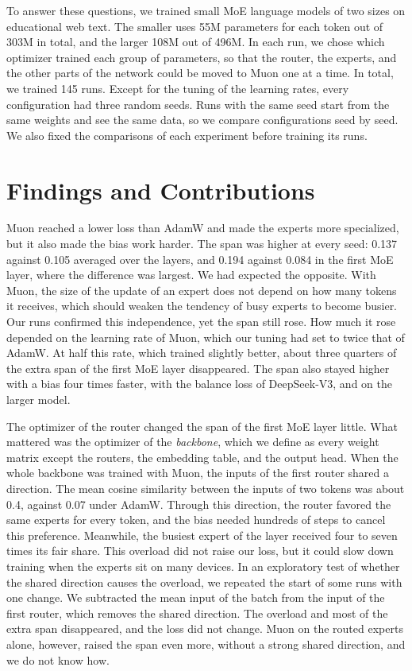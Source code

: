 To answer these questions, we trained small MoE language models of two sizes on educational web text. The smaller uses 55M parameters for each token out of 303M in total, and the larger 108M out of 496M\@. In each run, we chose which optimizer trained each group of parameters, so that the router, the experts, and the other parts of the network could be moved to Muon one at a time. In total, we trained 145 runs. Except for the tuning of the learning rates, every configuration had three random seeds. Runs with the same seed start from the same weights and see the same data, so we compare configurations seed by seed. We also fixed the comparisons of each experiment before training its runs.

\section{Findings and Contributions}
\label{sec:introduction-findings}
Muon reached a lower loss than AdamW and made the experts more specialized, but it also made the bias work harder. The span was higher at every seed: 0.137 against 0.105 averaged over the layers, and 0.194 against 0.084 in the first MoE layer, where the difference was largest. We had expected the opposite. With Muon, the size of the update of an expert does not depend on how many tokens it receives, which should weaken the tendency of busy experts to become busier. Our runs confirmed this independence, yet the span still rose. How much it rose depended on the learning rate of Muon, which our tuning had set to twice that of AdamW\@. At half this rate, which trained slightly better, about three quarters of the extra span of the first MoE layer disappeared. The span also stayed higher with a bias four times faster, with the balance loss of DeepSeek-V3, and on the larger model.

The optimizer of the router changed the span of the first MoE layer little. What mattered was the optimizer of the \emph{backbone}, which we define as every weight matrix except the routers, the embedding table, and the output head. When the whole backbone was trained with Muon, the inputs of the first router shared a direction. The mean cosine similarity between the inputs of two tokens was about 0.4, against 0.07 under AdamW\@. Through this direction, the router favored the same experts for every token, and the bias needed hundreds of steps to cancel this preference. Meanwhile, the busiest expert of the layer received four to seven times its fair share. This overload did not raise our loss, but it could slow down training when the experts sit on many devices. In an exploratory test of whether the shared direction causes the overload, we repeated the start of some runs with one change. We subtracted the mean input of the batch from the input of the first router, which removes the shared direction. The overload and most of the extra span disappeared, and the loss did not change. Muon on the routed experts alone, however, raised the span even more, without a strong shared direction, and we do not know how.


